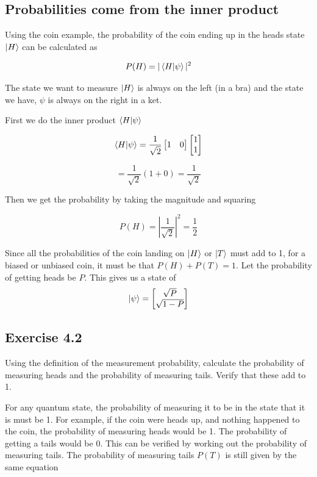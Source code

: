 \documentclass{book}
\begin{document}
\subsection{ Probabilities come from the inner product}

Using the coin example, the probability of the coin ending up in the heads state $\ket{H}$ can be calculated as

$$ P(H) = |\braket{H|\psi}|^2  $$

The state we want to measure $\ket{H}$ is always on the left (in a bra) and the state we have, $\psi$ is always on the right in a ket.

First we do the inner product $\braket{H|\psi}$

$$
\braket{H|\psi} = \frac{1}{\sqrt{2}}\begin{bmatrix} 1 & 0 \end{bmatrix} \begin{bmatrix} 1 \\ 1 \end{bmatrix}
$$

$$ = \frac{1}{\sqrt{2}} (1 + 0 ) = \frac{1}{\sqrt{2}}$$

Then we get the probability by taking the magnitude and squaring 

$$ P(H) = \left| \frac{1}{\sqrt{2}} \right|^2 = \frac{1}{2} $$

Since all the probabilities of the coin landing on $\ket{H}$ or $\ket{T}$ must add to 1, for a biased or unbiased coin, it must be that $P(H) + P(T) = 1$. Let the probability of getting heads be $P$. This gives us a state of 
$$
\ket{\psi} = \begin{bmatrix} \sqrt{P} \\ \sqrt{1-P} \end{bmatrix}
$$



\subsection{Exercise 4.2}

Using the definition of the measurement probability, calculate the probability of measuring heads and the probability of measuring tails. Verify that these add to 1. 
  


For any quantum state, the probability of measuring it to be in the state that it is must be 1. For example, if the coin were heads up, and nothing happened to the coin, the probability of measuring heads would be 1. The probability of getting a tails would be 0. This can be verified by working out the probability of measuring tails. The probability of measuring tails $P(T)$ is still given by the same equation 
\end{document}
